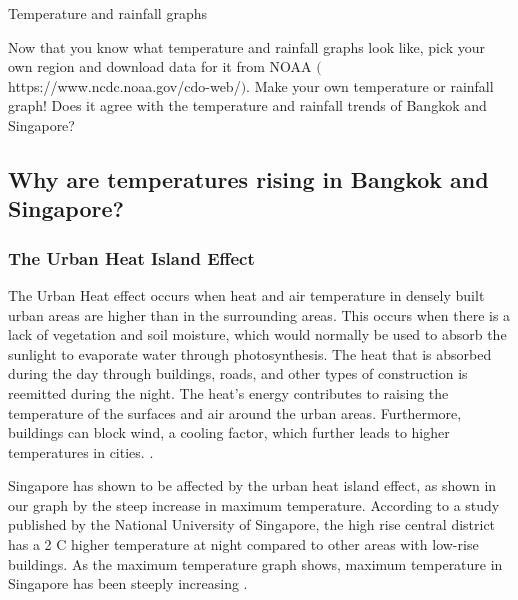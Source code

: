 

\begin{exercise}
Temperature and rainfall graphs

Now that you know what temperature and rainfall graphs look like, pick your own region and download data for it from NOAA $($https://www.ncdc.noaa.gov/cdo-web/$)$. Make your own temperature or rainfall graph! Does it agree with the temperature and rainfall trends of Bangkok and Singapore?
\end{exercise}


\subsection{Why are temperatures rising in Bangkok and Singapore?}



\subsubsection{The Urban Heat Island Effect}
The Urban Heat effect occurs when heat and air temperature in densely built urban areas are higher than in the surrounding areas. This occurs when there is a lack of vegetation and soil moisture, which would normally be used to absorb the sunlight to evaporate water through photosynthesis. The heat that is absorbed during the day through buildings, roads, and other types of construction is reemitted during the night. The heat's energy contributes to raising the temperature of the surfaces and air around the urban areas. Furthermore, buildings can block wind, a cooling factor, which further leads to higher temperatures in cities. \citep{urbanheatisland}.  

Singapore has shown to be affected by the urban heat island effect, as shown in our graph by the steep increase in maximum temperature. According to a study published by the National University of Singapore, the high rise central district has a  2 \degree C higher temperature at night compared to other areas with low-rise buildings. As the maximum temperature graph shows, maximum temperature in Singapore has been steeply increasing  \citep{singaporeclimatechange}. 

